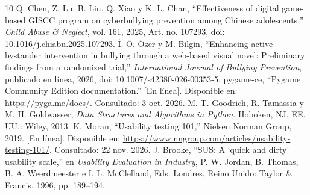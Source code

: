 \documentclass[conference]{IEEEtran}
\begin{document}
\begin{thebibliography}{10}
 Q. Chen, Z. Lu, B. Liu, Q. Xiao y K. L. Chan, ``Effectiveness of digital game-based GISCC program on cyberbullying prevention among Chinese adolescents,'' \textit{Child Abuse \& Neglect}, vol. 161, 2025, Art. no. 107293, doi: 10.1016/j.chiabu.2025.107293.
 \.I. Ö. Özer y M. Bilgin, ``Enhancing active bystander intervention in bullying through a web-based visual novel: Preliminary findings from a randomized trial,'' \textit{International Journal of Bullying Prevention}, publicado en línea, 2026, doi: 10.1007/s42380-026-00353-5.
 pygame-ce, ``Pygame Community Edition documentation.'' [En línea]. Disponible en: \url{https://pyga.me/docs/}. Consultado: 3 oct. 2026.
 M. T. Goodrich, R. Tamassia y M. H. Goldwasser, \textit{Data Structures and Algorithms in Python}. Hoboken, NJ, EE. UU.: Wiley, 2013.
 K. Moran, ``Usability testing 101,'' Nielsen Norman Group, 2019. [En línea]. Disponible en: \url{https://www.nngroup.com/articles/usability-testing-101/}. Consultado: 22 nov. 2026.
 J. Brooke, ``SUS: A `quick and dirty' usability scale,'' en \textit{Usability Evaluation in Industry}, P. W. Jordan, B. Thomas, B. A. Weerdmeester e I. L. McClelland, Eds. Londres, Reino Unido: Taylor \& Francis, 1996, pp. 189--194.
\end{thebibliography}
\end{document}
